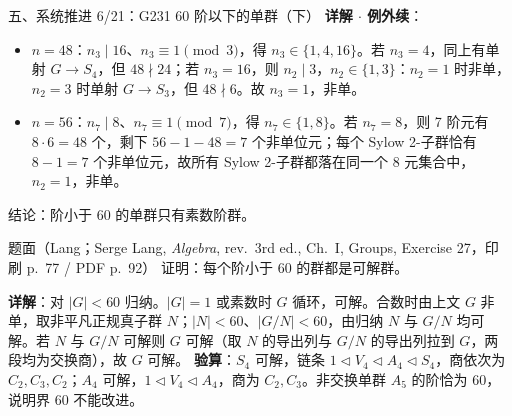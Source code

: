 \documentclass[aspectratio=169,10pt,fontset=none]{ctexbeamer}
\newcommand{\key}[1]{\textcolor{ink}{\bfseries #1}}
\begin{document}
\begin{frame}[t]{五、系统推进 6/21：G231 60 阶以下的单群（下）}
\scriptsize
\key{详解 $\cdot$ 例外续}：
\begin{itemize}
\item $n=48$：$n_3\mid16$、$n_3\equiv1\pmod3$，得 $n_3\in\{1,4,16\}$。若 $n_3=4$，同上有单射 $G\to S_4$，但 $48\nmid24$；若 $n_3=16$，则 $n_2\mid3$，$n_2\in\{1,3\}$：$n_2=1$ 时非单，$n_2=3$ 时单射 $G\to S_3$，但 $48\nmid6$。故 $n_3=1$，非单。
\item $n=56$：$n_7\mid8$、$n_7\equiv1\pmod7$，得 $n_7\in\{1,8\}$。若 $n_7=8$，则 7 阶元有 $8\cdot6=48$ 个，剩下 $56-1-48=7$ 个非单位元；每个 Sylow 2-子群恰有 $8-1=7$ 个非单位元，故所有 Sylow 2-子群都落在同一个 8 元集合中，$n_2=1$，非单。
\end{itemize}
结论：阶小于 $60$ 的单群只有素数阶群。

\begin{block}{\footnotesize 题面（Lang；Serge Lang, \emph{Algebra}, rev.\ 3rd ed., Ch.~I, Groups, Exercise 27，印刷 p.~77 / PDF p.~92）}
证明：每个阶小于 $60$ 的群都是可解群。
\end{block}
\key{详解}：对 $|G|<60$ 归纳。$|G|=1$ 或素数时 $G$ 循环，可解。合数时由上文 $G$ 非单，取非平凡正规真子群 $N$；$|N|<60$、$|G/N|<60$，由归纳 $N$ 与 $G/N$ 均可解。若 $N$ 与 $G/N$ 可解则 $G$ 可解（取 $N$ 的导出列与 $G/N$ 的导出列拉到 $G$，两段均为交换商），故 $G$ 可解。
\key{验算}：$S_4$ 可解，链条 $1\triangleleft V_4\triangleleft A_4\triangleleft S_4$，商依次为 $C_2,C_3,C_2$；$A_4$ 可解，$1\triangleleft V_4\triangleleft A_4$，商为 $C_2,C_3$。非交换单群 $A_5$ 的阶恰为 $60$，说明界 $60$ 不能改进。
\end{frame}
\end{document}
